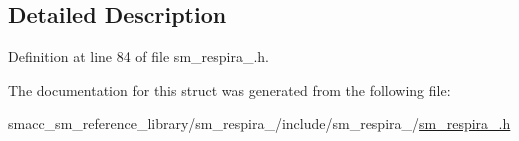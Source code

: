 \subsection{Detailed Description}


Definition at line 84 of file sm\+\_\+respira\+\_.\+h.



The documentation for this struct was generated from the following file\+:\begin{DoxyCompactItemize}
\item 
smacc\+\_\+sm\+\_\+reference\+\_\+library/sm\+\_\+respira\+\_/include/sm\+\_\+respira\+\_/\hyperlink{sm__respira__1_8h}{sm\+\_\+respira\+\_.\+h}\end{DoxyCompactItemize}
